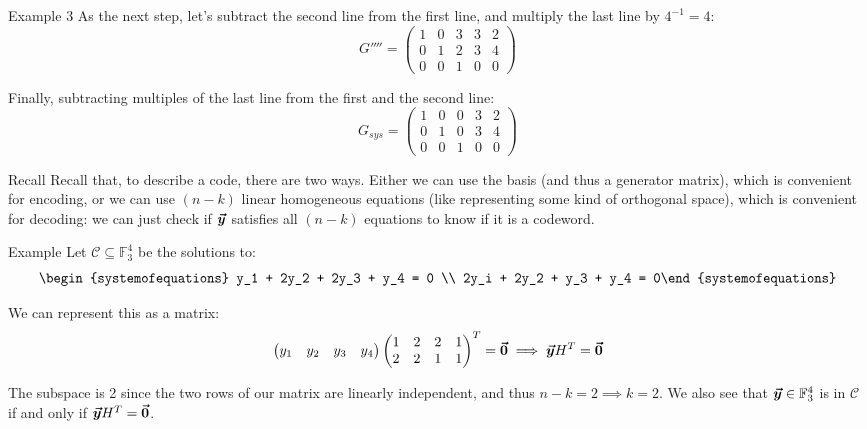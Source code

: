 \documentclass[a4paper]{article}
\begin{document}
\begin{parag}{Example 3}
    As the next step, let's subtract the second line from the first line, and multiply the last line by $4^{-1} = 4$: 
    \[G'''' = \begin{pmatrix} 1 & 0 & 3 & 3 & 2 \\ 0 & 1 & 2 & 3 & 4 \\ 0 & 0 & 1 & 0 & 0 \end{pmatrix} \]
    
    Finally, subtracting multiples of the last line from the first and the second line: 
    \[G_{sys} = \begin{pmatrix} 1 & 0 & 0 & 3 & 2 \\ 0 & 1 & 0 & 3 & 4 \\ 0 & 0 & 1 & 0 & 0 \end{pmatrix} \]
\end{parag}

\begin{parag}{Recall}
    Recall that, to describe a code, there are two ways. Either we can use the basis (and thus a generator matrix), which is convenient for encoding, or we can use $\left(n-k\right)$ linear homogeneous equations (like representing some kind of orthogonal space), which is convenient for decoding: we can just check if $\bm{\protect\vec{y}}$ satisfies all $\left(n-k\right)$ equations to know if it is a codeword. 
\end{parag}

\begin{parag}{Example}
    Let $\mathcal{C} \subseteq \mathbb{F}_3^4$ be the solutions to: 
    \[\begin{systemofequations} y_1 + 2y_2 + 2y_3 + y_4 = 0 \\ 2y_i + 2y_2 + y_3 + y_4 = 0\end{systemofequations}\]
    
    We can represent this as a matrix:
    \[\begin{pmatrix} y_1 & y_2 & y_3 & y_4 \end{pmatrix} \begin{pmatrix} 1 & 2 & 2 &  1 \\ 2 & 2 & 1 & 1 \end{pmatrix}^T = \bm{\protect\vec{0}} \implies \bm{\protect\vec{y}} H^T = \bm{\protect\vec{0}}\]

    The subspace is 2 since the two rows of our matrix are linearly independent, and thus $n - k = 2 \implies k = 2$. We also see that $\bm{\protect\vec{y}} \in \mathbb{F}_3^{4}$ is in $\mathcal{C}$ if and only if $\bm{\protect\vec{y}} H^T = \bm{\protect\vec{0}}$.
\end{parag}
\end{document}
